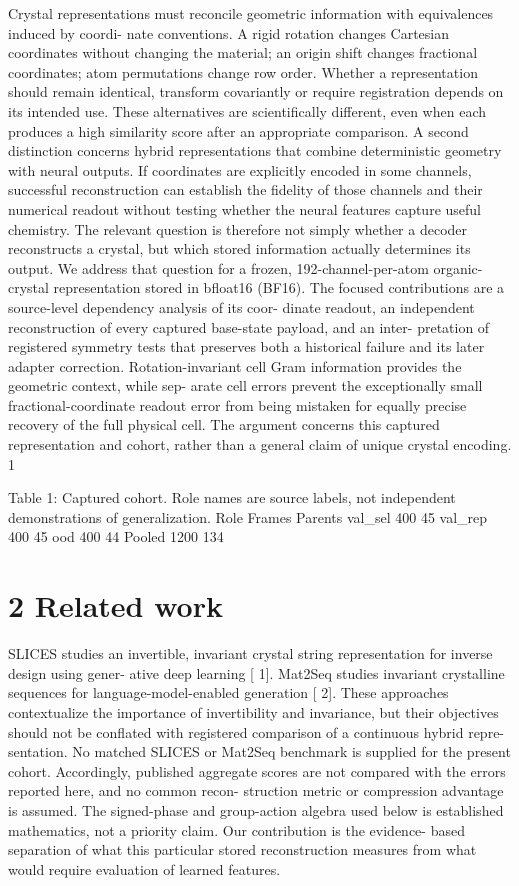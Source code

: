 \documentclass[11pt]{article}
\begin{document}
Crystal representations must reconcile geometric information with equivalences induced by coordi-
nate conventions. A rigid rotation changes Cartesian coordinates without changing the material;
an origin shift changes fractional coordinates; atom permutations change row order. Whether a
representation should remain identical, transform covariantly or require registration depends on
its intended use. These alternatives are scientifically different, even when each produces a high
similarity score after an appropriate comparison.
A second distinction concerns hybrid representations that combine deterministic geometry with
neural outputs. If coordinates are explicitly encoded in some channels, successful reconstruction
can establish the fidelity of those channels and their numerical readout without testing whether the
neural features capture useful chemistry. The relevant question is therefore not simply whether a
decoder reconstructs a crystal, but which stored information actually determines its output.
We address that question for a frozen, 192-channel-per-atom organic-crystal representation stored
in bfloat16 (BF16). The focused contributions are a source-level dependency analysis of its coor-
dinate readout, an independent reconstruction of every captured base-state payload, and an inter-
pretation of registered symmetry tests that preserves both a historical failure and its later adapter
correction. Rotation-invariant cell Gram information provides the geometric context, while sep-
arate cell errors prevent the exceptionally small fractional-coordinate readout error from being
mistaken for equally precise recovery of the full physical cell. The argument concerns this captured
representation and cohort, rather than a general claim of unique crystal encoding.
1

Table 1: Captured cohort. Role names are source labels, not independent demonstrations of
generalization.
Role Frames Parents
val\_sel 400 45
val\_rep 400 45
ood 400 44
Pooled 1200 134

\section*{2 Related work}

SLICES studies an invertible, invariant crystal string representation for inverse design using gener-
ative deep learning [ 1]. Mat2Seq studies invariant crystalline sequences for language-model-enabled
generation [ 2]. These approaches contextualize the importance of invertibility and invariance, but
their objectives should not be conflated with registered comparison of a continuous hybrid repre-
sentation.
No matched SLICES or Mat2Seq benchmark is supplied for the present cohort. Accordingly,
published aggregate scores are not compared with the errors reported here, and no common recon-
struction metric or compression advantage is assumed. The signed-phase and group-action algebra
used below is established mathematics, not a priority claim. Our contribution is the evidence-
based separation of what this particular stored reconstruction measures from what would require
evaluation of learned features.
\end{document}
